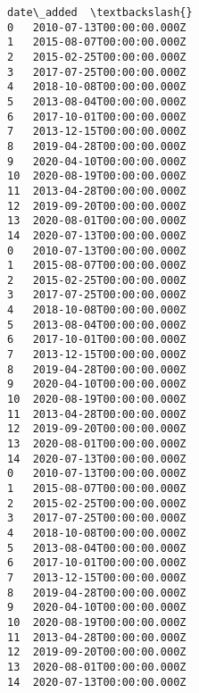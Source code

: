 \documentclass[11pt]{article}
\begin{document}
\begin{tcolorbox}[breakable, size=fbox, boxrule=.5pt, pad at break*=1mm, opacityfill=0]
\begin{Verbatim}[commandchars=\\\{\}]
                  date\_added  \textbackslash{}
0   2010-07-13T00:00:00.000Z
1   2015-08-07T00:00:00.000Z
2   2015-02-25T00:00:00.000Z
3   2017-07-25T00:00:00.000Z
4   2018-10-08T00:00:00.000Z
5   2013-08-04T00:00:00.000Z
6   2017-10-01T00:00:00.000Z
7   2013-12-15T00:00:00.000Z
8   2019-04-28T00:00:00.000Z
9   2020-04-10T00:00:00.000Z
10  2020-08-19T00:00:00.000Z
11  2013-04-28T00:00:00.000Z
12  2019-09-20T00:00:00.000Z
13  2020-08-01T00:00:00.000Z
14  2020-07-13T00:00:00.000Z
0   2010-07-13T00:00:00.000Z
1   2015-08-07T00:00:00.000Z
2   2015-02-25T00:00:00.000Z
3   2017-07-25T00:00:00.000Z
4   2018-10-08T00:00:00.000Z
5   2013-08-04T00:00:00.000Z
6   2017-10-01T00:00:00.000Z
7   2013-12-15T00:00:00.000Z
8   2019-04-28T00:00:00.000Z
9   2020-04-10T00:00:00.000Z
10  2020-08-19T00:00:00.000Z
11  2013-04-28T00:00:00.000Z
12  2019-09-20T00:00:00.000Z
13  2020-08-01T00:00:00.000Z
14  2020-07-13T00:00:00.000Z
0   2010-07-13T00:00:00.000Z
1   2015-08-07T00:00:00.000Z
2   2015-02-25T00:00:00.000Z
3   2017-07-25T00:00:00.000Z
4   2018-10-08T00:00:00.000Z
5   2013-08-04T00:00:00.000Z
6   2017-10-01T00:00:00.000Z
7   2013-12-15T00:00:00.000Z
8   2019-04-28T00:00:00.000Z
9   2020-04-10T00:00:00.000Z
10  2020-08-19T00:00:00.000Z
11  2013-04-28T00:00:00.000Z
12  2019-09-20T00:00:00.000Z
13  2020-08-01T00:00:00.000Z
14  2020-07-13T00:00:00.000Z


\end{Verbatim}
\end{tcolorbox}
\end{document}
